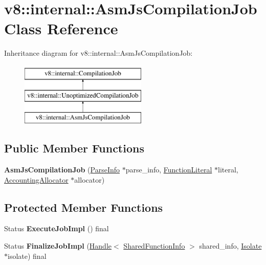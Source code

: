 \hypertarget{classv8_1_1internal_1_1AsmJsCompilationJob}{}\section{v8\+:\+:internal\+:\+:Asm\+Js\+Compilation\+Job Class Reference}
\label{classv8_1_1internal_1_1AsmJsCompilationJob}
Inheritance diagram for v8\+:\+:internal\+:\+:Asm\+Js\+Compilation\+Job\+:\begin{figure}[H]
\begin{center}
\leavevmode
\includegraphics[height=3.000000cm]{classv8_1_1internal_1_1AsmJsCompilationJob}
\end{center}
\end{figure}
\subsection*{Public Member Functions}
\begin{DoxyCompactItemize}
\item 
\mbox{\label{classv8_1_1internal_1_1AsmJsCompilationJob_a91f015a0af7265292c012d1db4d6ffae}} 
{\bfseries Asm\+Js\+Compilation\+Job} (\mbox{\hyperlink{classv8_1_1internal_1_1ParseInfo}{Parse\+Info}} $\ast$parse\+\_\+info, \mbox{\hyperlink{classv8_1_1internal_1_1FunctionLiteral}{Function\+Literal}} $\ast$literal, \mbox{\hyperlink{classv8_1_1internal_1_1AccountingAllocator}{Accounting\+Allocator}} $\ast$allocator)
\end{DoxyCompactItemize}
\subsection*{Protected Member Functions}
\begin{DoxyCompactItemize}
\item 
\mbox{\label{classv8_1_1internal_1_1AsmJsCompilationJob_a9c018710182fc6f59188c1c0a2471d45}} 
Status {\bfseries Execute\+Job\+Impl} () final
\item 
\mbox{\label{classv8_1_1internal_1_1AsmJsCompilationJob_ae28b7e45a68009fc7cf30e1148c9f137}} 
Status {\bfseries Finalize\+Job\+Impl} (\mbox{\hyperlink{classv8_1_1internal_1_1Handle}{Handle}}$<$ \mbox{\hyperlink{classv8_1_1internal_1_1SharedFunctionInfo}{Shared\+Function\+Info}} $>$ shared\+\_\+info, \mbox{\hyperlink{classv8_1_1internal_1_1Isolate}{Isolate}} $\ast$isolate) final
\end{DoxyCompactItemize}
